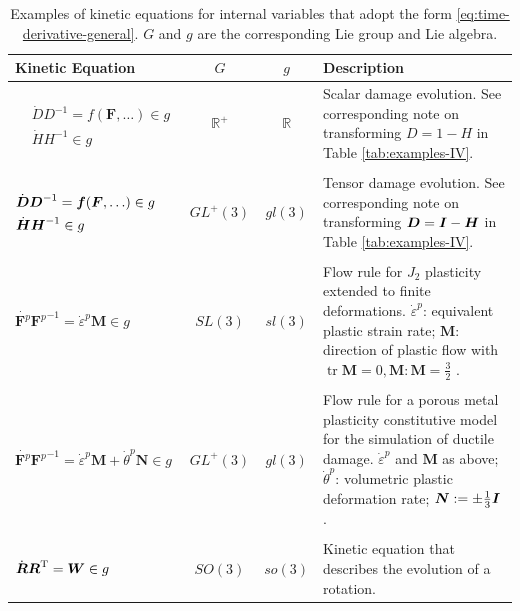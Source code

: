 \documentclass[12pt]{article}
\newcommand{\mbs}[1]{\boldsymbol{#1}}
\newcommand{\mbb}[1]{\mathbb{#1}}
\def\bD{{\mbs{D}}} \def\bE{{\mbs{E}}} \def\bF{{\mbs{F}}}
\def\bM{{\mbs{M}}} \def\bN{{\mbs{N}}} \def\bO{{\mbs{O}}}
\DeclareMathOperator{\tr}{tr}
\begin{document}
\begin{table}[htbp]
  \begin{center}
    \begin{tabular}{ l c c p{60mm} }
      \toprule
      Kinetic Equation
      &
      $G$
      &
      $g$
      &
      Description
      \\
      \hline
      \multirow{2}{*}{$
      \begin{aligned}
        & \dot{D} D^{-1} = f(\bF,\ldots) \in g
        \\
        & \dot{H} H^{-1} \in g
      \end{aligned}$}
      &
      $\mbb{R}^+$
      &
      $\mbb{R}$
      &
      Scalar damage evolution. See corresponding note on
      transforming $D = 1 - H$ in Table
      \ref{tab:examples-IV}.
      \\
      \\
      \multirow{2}{*}{$
      \begin{aligned}
        & \dot{\bD}\bD^{-1} = \fb(\bF,\ldots) \in g
        \\
        & \dot{\bH}\bH^{-1} \in g
      \end{aligned}$}
      &
      $GL^+(3)$
      &
      $gl(3)$
      &
      Tensor damage evolution. See corresponding note on
      transforming $\bD = \bI - \bH$ in Table
      \ref{tab:examples-IV}.
      \\
      \\
      $\dot{\bF^p} {\bF^p}^{-1} = \dot{\varepsilon}^p \bM \in g$
      &
      $SL(3)$
      &
      $sl(3)$
      &
      Flow rule for $J_2$ plasticity extended to finite
      deformations. $\dot{\varepsilon}^p$: equivalent plastic strain rate;
      $\bM$: direction of plastic flow with $\tr \bM = 0, \bM:\bM =
      \frac{3}{2}$
      \citep{Ortiz.Stainier:1999}.
      \\
      \\
      $\dot{\bF^p} {\bF^p}^{-1} = \dot{\varepsilon}^p \bM +
      \dot{\theta}^p \bN \in g$
      &
      $GL^+(3)$
      &
      $gl(3)$
      &
      Flow rule for a porous metal plasticity constitutive model for
      the simulation of ductile damage. $\dot{\varepsilon}^p$ and
      $\bM$ as above; $\dot{\theta}^p$: volumetric plastic deformation rate;
      $\bN := \pm \frac{1}{3} \bI$ \citep{Weinberg.etal:2006}.
      \\
      \\
      $\dot{\bR} {\bR}^{\text{T}} = \bW \in g$
      &
      $SO(3)$
      &
      $so(3)$
      &
      Kinetic equation that describes the evolution of a rotation.
      \\
      \bottomrule
    \end{tabular}
    \caption{Examples of kinetic equations for internal variables that
      adopt the form \ref{eq:time-derivative-general}. $G$ and $g$ are
      the corresponding Lie group and Lie algebra.}
    \label{tab:examples-evolution}
  \end{center}
\end{table}
\end{document}
